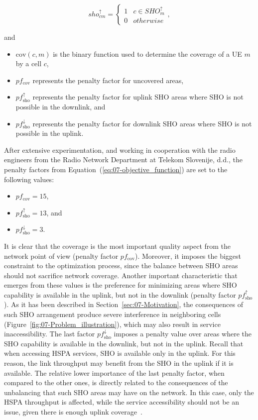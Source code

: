 \begin{equation}
sho_{cm}^{\uparrow}=\begin{cases}
1 & c\in SHO_{m}^{\uparrow}\\
0 & otherwise
\end{cases},
\end{equation}


\noindent and
\begin{itemize}
\item $\mathrm{cov}(c,m)$ is the binary function used to determine the
coverage of a UE $m$ by a cell $c$,
\item $pf_{\mathrm{cov}}$ represents the penalty factor for uncovered areas,
\item $pf_{\mathrm{sho}}^{\uparrow}$ represents the penalty factor for
uplink SHO areas where SHO is not possible in the downlink, and
\item $pf_{\mathrm{sho}}^{\downarrow}$ represents the penalty factor for
downlink SHO areas where SHO is not possible in the uplink.
\end{itemize}
\bigskip{}


After extensive experimentation, and working in cooperation with the
radio engineers from the Radio Network Department at Telekom Slovenije,
d.d., the penalty factors from Equation~(\ref{eq:07-objective_function})
are set to the following values:
\begin{itemize}
\item $pf_{\mathrm{cov}}=15$,
\item $pf_{\mathrm{sho}}^{\uparrow}=13$, and
\item $pf_{\mathrm{sho}}^{\downarrow}=3$.
\end{itemize}
It is clear that the coverage is the most important quality aspect
from the network point of view (penalty factor $pf_{\mathrm{cov}}$).
Moreover, it imposes the biggest constraint to the optimization process,
since the balance between SHO areas should not sacrifice network coverage.
Another important characteristic that emerges from these values is
the preference for minimizing areas where SHO capability is available
in the uplink, but not in the downlink (penalty factor $pf_{\mathrm{sho}}^{\uparrow}$).
As it has been described in Section~\ref{sec:07-Motivation}, the
consequences of such SHO arrangement produce severe interference in
neighboring cells (Figure~\ref{fig:07-Problem_illustration}), which
may also result in service inaccessibility. The last factor $pf_{\mathrm{sho}}^{\downarrow}$
imposes a penalty value over areas where the SHO capability is available
in the downlink, but not in the uplink. Recall that when accessing
HSPA services, SHO is available only in the uplink. For this reason,
the link throughput may benefit from the SHO in the uplink if it is
available. The relative lower importance of the last penalty factor,
when compared to the other ones, is directly related to the consequences
of the unbalancing that such SHO areas may have on the network. In
this case, only the HSPA throughput is affected, while the service
accessibility should not be an issue, given there is enough uplink
coverage~\cite{holma2006hsdpa}.


